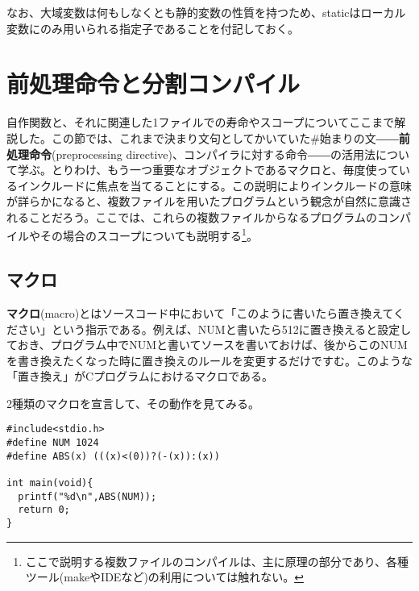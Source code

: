 なお、大域変数は何もしなくとも静的変数の性質を持つため、staticはローカル変数にのみ用いられる指定子であることを付記しておく。

\section{前処理命令と分割コンパイル}
自作関数と、それに関連した1ファイルでの寿命やスコープについてここまで解説した。この節では、これまで決まり文句としてかいていた\#始まりの文――\textbf{前処理命令}(preprocessing directive)、コンパイラに対する命令――の活用法について学ぶ。とりわけ、もう一つ重要なオブジェクトであるマクロと、毎度使っているインクルードに焦点を当てることにする。この説明によりインクルードの意味が詳らかになると、複数ファイルを用いたプログラムという観念が自然に意識されることだろう。ここでは、これらの複数ファイルからなるプログラムのコンパイルやその場合のスコープについても説明する\footnote{ここで説明する複数ファイルのコンパイルは、主に原理の部分であり、各種ツール(makeやIDEなど)の利用については触れない。}。
\subsection{マクロ}
\textbf{マクロ}(macro)とはソースコード中において「このように書いたら置き換えてください」という指示である。例えば、NUMと書いたら512に置き換えると設定しておき、プログラム中でNUMと書いてソースを書いておけば、後からこのNUMを書き換えたくなった時に置き換えのルールを変更するだけですむ。このような「置き換え」がCプログラムにおけるマクロである。
\begin{boxnote}
2種類のマクロを宣言して、その動作を見てみる。
\begin{lstlisting}[caption=マクロの利用,label=program6_4]
#include<stdio.h>
#define NUM 1024
#define ABS(x) (((x)<(0))?(-(x)):(x))

int main(void){
  printf("%d\n",ABS(NUM));
  return 0;
}
\end{lstlisting}
\end{boxnote}

